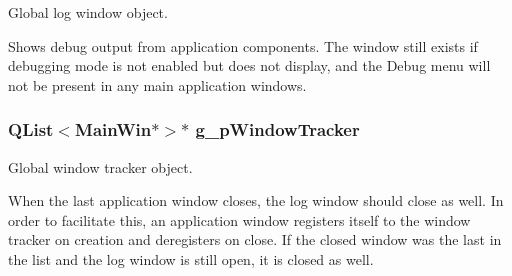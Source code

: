 Global log window object. 

Shows debug output from application components. The window still exists if debugging mode is not enabled but does not display, and the Debug menu will not be present in any main application windows. \hypertarget{group___global_variables_gab5d481b5087f9956e533067ad8001d78}{
\subsubsection[{g\-\_\-p\-Window\-Tracker}]{\setlength{\rightskip}{0pt plus 5cm}Q\-List$<${\bf Main\-Win}$\ast$$>$$\ast$ g\-\_\-p\-Window\-Tracker}}\label{group___global_variables_gab5d481b5087f9956e533067ad8001d78}


Global window tracker object. 

When the last application window closes, the log window should close as well. In order to facilitate this, an application window registers itself to the window tracker on creation and deregisters on close. If the closed window was the last in the list and the log window is still open, it is closed as well. 